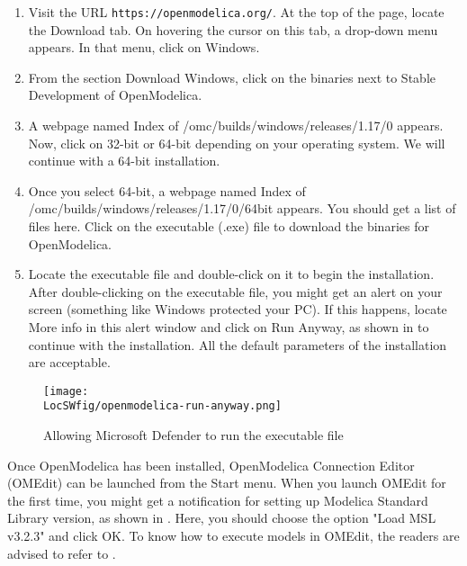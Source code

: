 \begin{enumerate}
      \item Visit the URL {\tt https://openmodelica.org/}.  At the top of the page, locate the Download tab. On hovering the cursor on this tab, a drop-down menu appears. In that menu, click on Windows. 
      \item From the section Download Windows, click on the binaries next to Stable Development of OpenModelica. 
      \item A webpage named Index of /omc/builds/windows/releases/1.17/0 appears. Now, click on 32-bit or 64-bit depending on your operating system. We will continue with a 64-bit installation. 
      \item Once you select 64-bit, a webpage named Index of /omc/builds/windows/releases/1.17/0/64bit appears. You should get a list of files here. Click on the executable (.exe) file to download the binaries for OpenModelica.
      \item Locate the executable file and double-click on it to begin the 
      installation. After double-clicking on the executable file, 
      you might get an alert on your screen (something like Windows protected your PC). 
      If this happens, locate More info in this alert window and click on 
      Run Anyway, as shown in  to continue with the 
      installation. All the default parameters of the installation are acceptable. 
\end{enumerate}

\begin{figure}
      \centering
      \texttt{[image: \\LocSWfig/openmodelica-run-anyway.png]}
      \caption{Allowing Microsoft Defender to run the executable file}
      \label{om-run-anyway}
\end{figure}

Once OpenModelica has been installed, OpenModelica Connection Editor (OMEdit) 
can be launched from the Start menu.  When you 
launch OMEdit for the first time, you might get a notification for setting up 
Modelica Standard Library version, as shown in . Here, you 
should choose the option "Load MSL v3.2.3" and click OK.  To know how to execute models 
in OMEdit, the readers are advised to refer to . 


